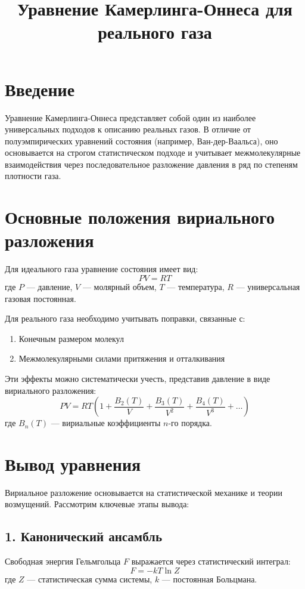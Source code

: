 \documentclass[12pt]{article}
\title{Уравнение Камерлинга-Оннеса для реального газа}
\date{}
\begin{document}
\maketitle

\section*{Введение}
Уравнение Камерлинга-Оннеса представляет собой один из наиболее универсальных подходов к описанию реальных газов. В отличие от полуэмпирических уравнений состояния (например, Ван-дер-Ваальса), оно основывается на строгом статистическом подходе и учитывает межмолекулярные взаимодействия через последовательное разложение давления в ряд по степеням плотности газа.

\section{Основные положения вириального разложения}
Для идеального газа уравнение состояния имеет вид:
$$
PV = RT
$$
где $P$ — давление, $V$ — молярный объем, $T$ — температура, $R$ — универсальная газовая постоянная.

Для реального газа необходимо учитывать поправки, связанные с:
\begin{enumerate}
    \item Конечным размером молекул
    \item Межмолекулярными силами притяжения и отталкивания
\end{enumerate}

Эти эффекты можно систематически учесть, представив давление в виде вириального разложения:
\[
PV = RT \left(1 + \frac{B_2(T)}{V} + \frac{B_3(T)}{V^2} + \frac{B_4(T)}{V^3} + \dots \right)
\]
где $B_n(T)$ — вириальные коэффициенты $n$-го порядка.

\section{Вывод уравнения}
Вириальное разложение основывается на статистической механике и теории возмущений. Рассмотрим ключевые этапы вывода:

\subsection{1. Канонический ансамбль}
Свободная энергия Гельмгольца $F$ выражается через статистический интеграл:
$$
F = -kT \ln Z
$$
где $Z$ — статистическая сумма системы, $k$ — постоянная Больцмана.
\end{document}
